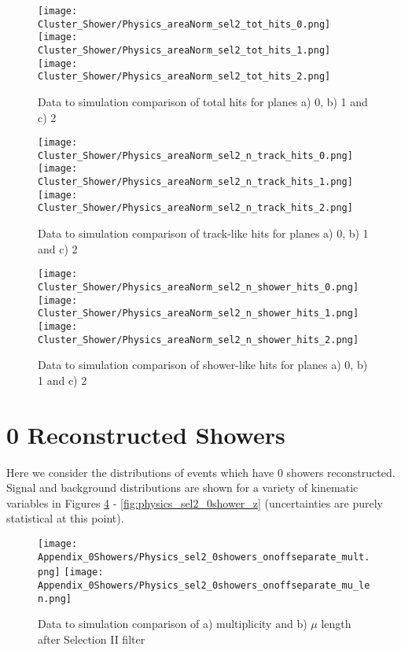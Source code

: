 \documentclass{article}
\begin{document}
\begin{figure}[h!]
\centering
\texttt{[image: Cluster\_Shower/Physics\_areaNorm\_sel2\_tot\_hits\_0.png]}
\texttt{[image: Cluster\_Shower/Physics\_areaNorm\_sel2\_tot\_hits\_1.png]}
\texttt{[image: Cluster\_Shower/Physics\_areaNorm\_sel2\_tot\_hits\_2.png]}
\caption{ Data to simulation comparison of total hits for planes a) 0, b) 1 and c) 2 }
\label{fig:appendix_areanorm_hits}
\end{figure}

\begin{figure}[h!]
\centering
\texttt{[image: Cluster\_Shower/Physics\_areaNorm\_sel2\_n\_track\_hits\_0.png]}
\texttt{[image: Cluster\_Shower/Physics\_areaNorm\_sel2\_n\_track\_hits\_1.png]}
\texttt{[image: Cluster\_Shower/Physics\_areaNorm\_sel2\_n\_track\_hits\_2.png]}
\caption{ Data to simulation comparison of track-like hits for planes a) 0, b) 1 and c) 2 }
\label{fig:appendix_areanorm_trackhits}
\end{figure}

\begin{figure}[h!]
\centering
\texttt{[image: Cluster\_Shower/Physics\_areaNorm\_sel2\_n\_shower\_hits\_0.png]}
\texttt{[image: Cluster\_Shower/Physics\_areaNorm\_sel2\_n\_shower\_hits\_1.png]}
\texttt{[image: Cluster\_Shower/Physics\_areaNorm\_sel2\_n\_shower\_hits\_2.png]}
\caption{ Data to simulation comparison of shower-like hits for planes a) 0, b) 1 and c) 2 }
\label{fig:appendix_areanorm_showerhits}
\end{figure}

\clearpage
\section{0 Reconstructed Showers}
\label{sec:AppC}
Here we consider the distributions of events which have 0 showers reconstructed. Signal and background distributions are shown for a variety of kinematic variables in Figures \ref{fig:physics_sel2_0shower_mulen} - \ref{fig:physics_sel2_0shower_z} (uncertainties are purely statistical at this point). 

\begin{figure}[h!]
\centering
\texttt{[image: Appendix\_0Showers/Physics\_sel2\_0showers\_onoffseparate\_mult.png]}
\hspace{2 mm}
\texttt{[image: Appendix\_0Showers/Physics\_sel2\_0showers\_onoffseparate\_mu\_len.png]}
\caption{ Data to simulation comparison of a) multiplicity and b) $\mu$ length after Selection II filter }
\label{fig:physics_sel2_0shower_mulen}
\end{figure}
\end{document}

